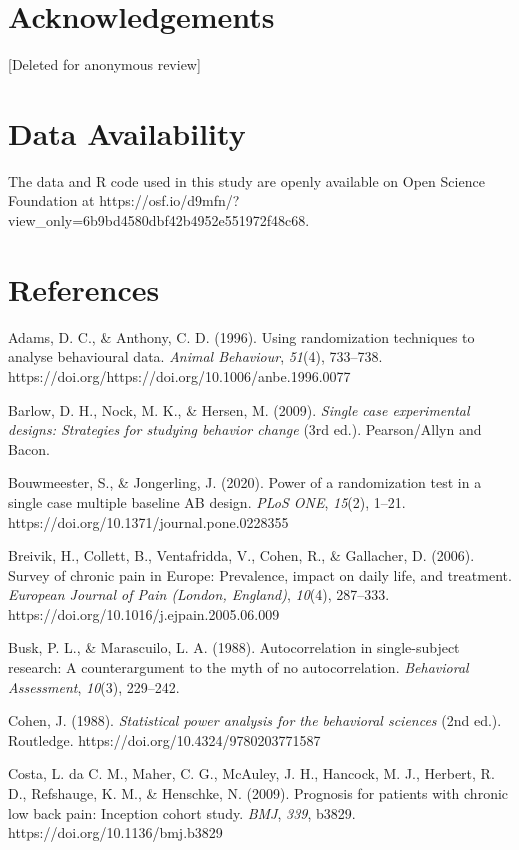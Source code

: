 \documentclass{article}
\begin{document}
\section{Acknowledgements}

[Deleted for anonymous review]

\section{Data Availability}

The data and R code used in this study are openly available on Open Science Foundation at https://osf.io/d9mfn/?view\_only=6b9bd4580dbf42b4952e551972f48c68.



\section{References}

Adams, D. C., \& Anthony, C. D. (1996). Using randomization techniques to analyse behavioural data. \emph{Animal Behaviour}, \emph{51}(4), 733--738. https://doi.org/https://doi.org/10.1006/anbe.1996.0077

Barlow, D. H., Nock, M. K., \& Hersen, M. (2009). \emph{Single case experimental designs: Strategies for studying behavior change} (3rd ed.). Pearson/Allyn and Bacon.

Bouwmeester, S., \& Jongerling, J. (2020). Power of a randomization test in a single case multiple baseline AB design. \emph{PLoS ONE}, \emph{15}(2), 1--21. https://doi.org/10.1371/journal.pone.0228355

Breivik, H., Collett, B., Ventafridda, V., Cohen, R., \& Gallacher, D. (2006). Survey of chronic pain in Europe: Prevalence, impact on daily life, and treatment. \emph{European Journal of Pain (London, England)}, \emph{10}(4), 287--333. https://doi.org/10.1016/j.ejpain.2005.06.009

Busk, P. L., \& Marascuilo, L. A. (1988). Autocorrelation in single-subject research: A counterargument to the myth of no autocorrelation. \emph{Behavioral Assessment}, \emph{10}(3), 229--242.

Cohen, J. (1988). \emph{Statistical power analysis for the behavioral sciences} (2nd ed.). Routledge. https://doi.org/10.4324/9780203771587

Costa, L. da C. M., Maher, C. G., McAuley, J. H., Hancock, M. J., Herbert, R. D., Refshauge, K. M., \& Henschke, N. (2009). Prognosis for patients with chronic low back pain: Inception cohort study. \emph{BMJ}, \emph{339}, b3829. https://doi.org/10.1136/bmj.b3829
\end{document}
